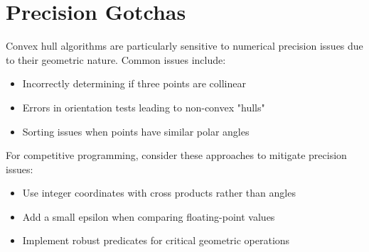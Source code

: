 \clearpage
\section{Precision Gotchas}
\label{sec:precision_gotchas}
\begin{warning}
Convex hull algorithms are particularly sensitive to numerical precision issues due to their geometric nature. Common issues include:
\begin{itemize}
    \item Incorrectly determining if three points are collinear
    \item Errors in orientation tests leading to non-convex "hulls"
    \item Sorting issues when points have similar polar angles
\end{itemize}
\end{warning}

\begin{implementation}
For competitive programming, consider these approaches to mitigate precision issues:
\begin{itemize}
    \item Use integer coordinates with cross products rather than angles
    \item Add a small epsilon when comparing floating-point values
    \item Implement robust predicates for critical geometric operations
\end{itemize}
\end{implementation}

